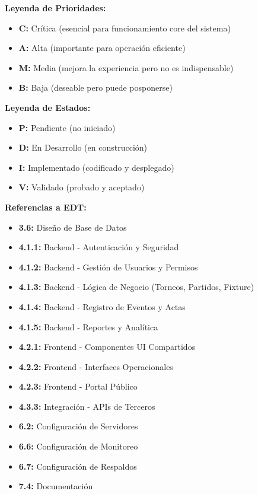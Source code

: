 \documentclass[12pt,a4paper]{article}
\begin{document}
\textbf{Leyenda de Prioridades:}
\begin{itemize}[noitemsep]
    \item \textbf{C:} Crítica (esencial para funcionamiento core del sistema)
    \item \textbf{A:} Alta (importante para operación eficiente)
    \item \textbf{M:} Media (mejora la experiencia pero no es indispensable)
    \item \textbf{B:} Baja (deseable pero puede posponerse)
\end{itemize}

\textbf{Leyenda de Estados:}
\begin{itemize}[noitemsep]
    \item \textbf{P:} Pendiente (no iniciado)
    \item \textbf{D:} En Desarrollo (en construcción)
    \item \textbf{I:} Implementado (codificado y desplegado)
    \item \textbf{V:} Validado (probado y aceptado)
\end{itemize}

\textbf{Referencias a EDT:}

\begin{itemize}[noitemsep]
    \item \textbf{3.6:} Diseño de Base de Datos
    \item \textbf{4.1.1:} Backend - Autenticación y Seguridad
    \item \textbf{4.1.2:} Backend - Gestión de Usuarios y Permisos
    \item \textbf{4.1.3:} Backend - Lógica de Negocio (Torneos, Partidos, Fixture)
    \item \textbf{4.1.4:} Backend - Registro de Eventos y Actas
    \item \textbf{4.1.5:} Backend - Reportes y Analítica
    \item \textbf{4.2.1:} Frontend - Componentes UI Compartidos
    \item \textbf{4.2.2:} Frontend - Interfaces Operacionales
    \item \textbf{4.2.3:} Frontend - Portal Público
    \item \textbf{4.3.3:} Integración - APIs de Terceros
    \item \textbf{6.2:} Configuración de Servidores
    \item \textbf{6.6:} Configuración de Monitoreo
    \item \textbf{6.7:} Configuración de Respaldos
    \item \textbf{7.4:} Documentación
\end{itemize}
\end{document}
